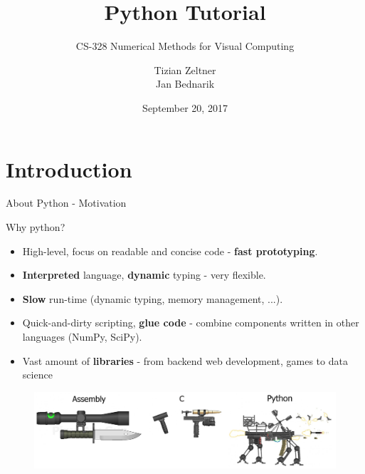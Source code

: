 \documentclass[10pt]{beamer}
\title{Python Tutorial}
\subtitle{CS-328 Numerical Methods for Visual Computing}
\date{September 20, 2017}
\author{Tizian Zeltner\\
Jan Bednarik}
\begin{document}
\maketitle


\section{Introduction}

\begin{frame}{About Python - Motivation}

	Why python?

	\begin{itemize}
	\item \pause High-level, focus on readable and concise code - \textbf{fast prototyping}.
	\item \pause \textbf{Interpreted} language, \textbf{dynamic} typing - very flexible.
	\item \pause \textbf{Slow} run-time (dynamic typing, memory management, ...).
	\item \pause Quick-and-dirty scripting, \textbf{glue code} - combine components written in other languages (NumPy, SciPy).
	\item \pause Vast amount of \textbf{libraries} - from backend web development, games to data science
	\end{itemize}

	\pause
	\begin{figure}[!h]
		\centering
		\includegraphics[width=0.9\linewidth]{img/python_vs_others.png}
	\end{figure}

\end{frame}

\end{document}

